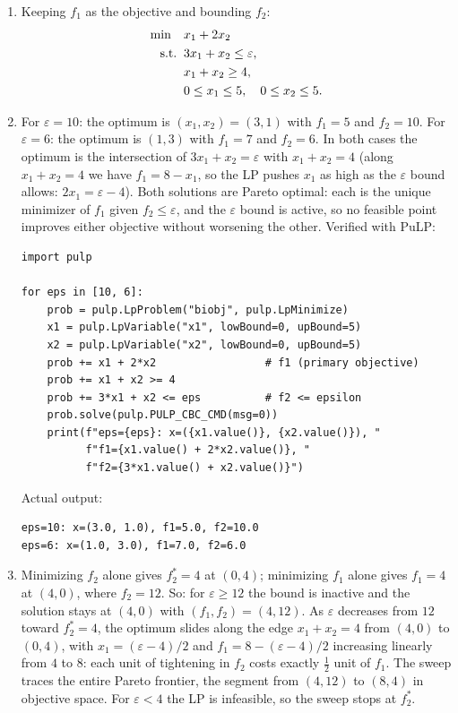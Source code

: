 \begin{enumerate}
\item Keeping $f_1$ as the objective and bounding $f_2$:
\begin{align*}
\min \quad & x_1 + 2x_2 \\
\text{s.t.}\;\; & 3x_1 + x_2 \leq \varepsilon, \\
& x_1 + x_2 \geq 4, \\
& 0 \leq x_1 \leq 5, \quad 0 \leq x_2 \leq 5.
\end{align*}
\item For $\varepsilon = 10$: the optimum is $(x_1, x_2) = (3, 1)$ with
$f_1 = 5$ and $f_2 = 10$. For $\varepsilon = 6$: the optimum is $(1, 3)$
with $f_1 = 7$ and $f_2 = 6$. In both cases the optimum is the intersection
of $3x_1 + x_2 = \varepsilon$ with $x_1 + x_2 = 4$ (along $x_1 + x_2 = 4$ we
have $f_1 = 8 - x_1$, so the LP pushes $x_1$ as high as the $\varepsilon$
bound allows: $2x_1 = \varepsilon - 4$). Both solutions are Pareto optimal:
each is the unique minimizer of $f_1$ given $f_2 \leq \varepsilon$, and the
$\varepsilon$ bound is active, so no feasible point improves either objective
without worsening the other. Verified with PuLP:

\begin{verbatim}
import pulp

for eps in [10, 6]:
    prob = pulp.LpProblem("biobj", pulp.LpMinimize)
    x1 = pulp.LpVariable("x1", lowBound=0, upBound=5)
    x2 = pulp.LpVariable("x2", lowBound=0, upBound=5)
    prob += x1 + 2*x2                 # f1 (primary objective)
    prob += x1 + x2 >= 4
    prob += 3*x1 + x2 <= eps          # f2 <= epsilon
    prob.solve(pulp.PULP_CBC_CMD(msg=0))
    print(f"eps={eps}: x=({x1.value()}, {x2.value()}), "
          f"f1={x1.value() + 2*x2.value()}, "
          f"f2={3*x1.value() + x2.value()}")
\end{verbatim}

Actual output:
\begin{verbatim}
eps=10: x=(3.0, 1.0), f1=5.0, f2=10.0
eps=6: x=(1.0, 3.0), f1=7.0, f2=6.0
\end{verbatim}

\item Minimizing $f_2$ alone gives $f_2^* = 4$ at $(0, 4)$; minimizing $f_1$
alone gives $f_1 = 4$ at $(4, 0)$, where $f_2 = 12$. So: for
$\varepsilon \geq 12$ the bound is inactive and the solution stays at
$(4,0)$ with $(f_1, f_2) = (4, 12)$. As $\varepsilon$ decreases from $12$
toward $f_2^* = 4$, the optimum slides along the edge $x_1 + x_2 = 4$ from
$(4,0)$ to $(0,4)$, with $x_1 = (\varepsilon - 4)/2$ and
$f_1 = 8 - (\varepsilon - 4)/2$ increasing linearly from $4$ to $8$: each
unit of tightening in $f_2$ costs exactly $\tfrac12$ unit of $f_1$. The
sweep traces the entire Pareto frontier, the segment from $(4,12)$ to
$(8,4)$ in objective space. For $\varepsilon < 4$ the LP is infeasible, so
the sweep stops at $f_2^*$.
\end{enumerate}

